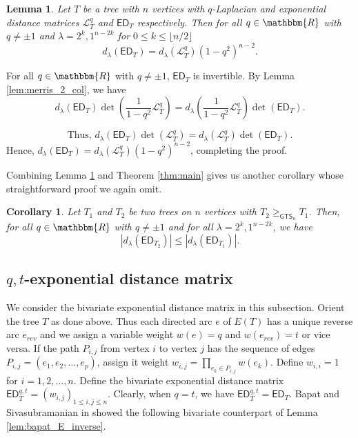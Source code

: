 \documentclass[12pt]{article}
\def\eod{\vrule height 6pt width 5pt depth 0pt}
\newenvironment{proof}{\noindent {\bf Proof:} \hspace{.2em}}
                      {\hspace*{\fill}{\eod}}
\newtheorem{lemma}[theorem]{Lemma}
\newtheorem{corollary}[theorem]{Corollary}
\newcommand{\ED}{ \mathsf{ED}}
\newcommand{\sL}{  \mathcal{ L}}
\newcommand{\RR}{ \mathbbm{R}}
\newcommand{\nhalf}{\lfloor n/2 \rfloor}
\newcommand{\GTS}{\mathsf{GTS}}
\begin{document}
\begin{lemma}
  \label{lem:lapl-expo}
Let $T$ be a tree with $n$ vertices with 
$q$-Laplacian and  exponential distance matrices
$\sL_T^q$ and $\ED_T$  respectively. 
Then for all $q\in \RR$ with $q\neq \pm 1$ 
and $\lambda=2^k,1^{n-2k}$ for $0\leq k\leq \nhalf$
$$d_{\lambda}(\ED_T)=d_{\lambda}(\sL_T^q)(1-q^2)^{n-2}.$$ 
\end{lemma}
\begin{proof}
For all $q\in \RR$ with $q\neq \pm 1$, $\ED_T$ is invertible.
By Lemma \ref{lem:merris_2_col}, we have 
$$d_{\lambda}(\ED_T)\det\left(\frac{1}{1-q^2}\sL_T^q \right) 
 =  d_{\lambda}\left(\frac{1}{1-q^2}\sL_T^q \right)\det(\ED_T).$$ 
 
 
 $$\mbox{Thus, } d_{\lambda}(\ED_T) \det\left(\sL_T^q \right) =  d_{\lambda} \left(\sL_T^q \right)  \det(\ED_T). $$
Hence,  
$d_{\lambda}(\ED_T)=d_{\lambda}(\sL_T^q)(1-q^2)^{n-2}$, completing
the proof.
\end{proof}

Combining Lemma \ref{lem:lapl-expo} and Theorem \ref{thm:main} 
gives us another corollary whose straightforward proof we 
again omit.


\begin{corollary}
  \label{cor:immanant_ed_t}
Let $T_1$ and $T_2$ be two trees on $n$ vertices with 
$T_2\geq_{\GTS_n}T_1$. Then, for all $q\in \RR$ with 
$q\neq \pm 1$  and for all 
$\lambda=2^k,1^{n-2k}$, we have
$$|d_{\lambda}(\ED_{T_2})|\leq |d_{\lambda}(\ED_{T_1})|.$$
\end{corollary}


\subsection{$q,t$-exponential distance matrix}

We consider the bivariate exponential distance matrix in this subsection.
Orient the tree $T$ as done above.  Thus each 
directed arc $e$ of $E(T)$ has a unique reverse arc $e_{rev}$ and
we assign a variable weight $w(e) = q$ and $w(e_{rev}) = t$ or 
vice versa.  If the path
$P_{i,j}$ from vertex $i$ to vertex $j$ has the sequence of 
edges $P_{i,j} = (e_1,e_2, \ldots, e_p)$,  assign it weight
$w_{i,j} = \prod_{e_k \in P_{i,j}} w(e_k)$.  
Define $w_{i,i}=1$ for $i=1,2,\ldots,n$.
Define the bivariate exponential distance matrix 
$\ED_T^{q,t} = (w_{i,j})_{1 \leq i,j \leq n}$.
Clearly, when $q=t$, we have $\ED_T^{q,t} = \ED_T$.
Bapat and Sivasubramanian in \cite{bapat-siva-prod_dist_matrix} 
showed the following bivariate counterpart of Lemma 
\ref{lem:bapat_E_inverse}.
\end{document}
